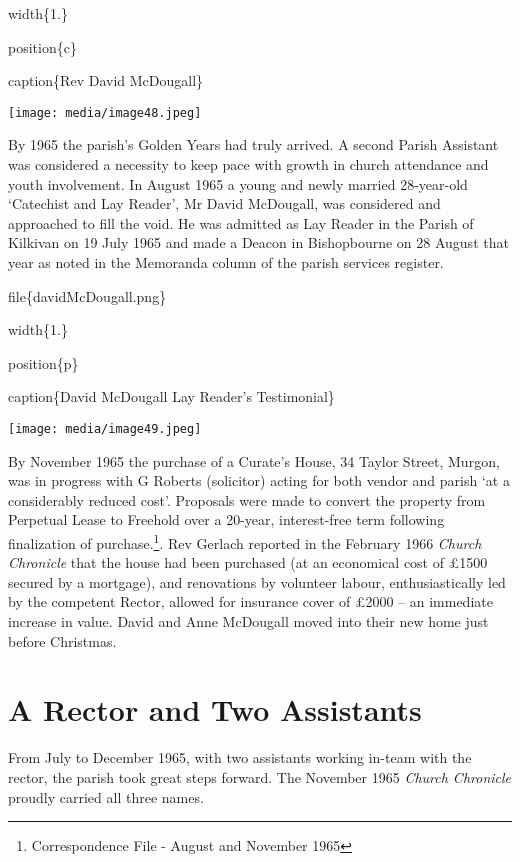 width\{1.\}

position\{c\}

caption\{Rev David McDougall\}

\texttt{[image: media/image48.jpeg]}

By 1965 the parish's Golden Years had truly arrived. A second Parish Assistant was considered a necessity to keep pace with growth in church attendance and youth involvement. In August 1965 a young and newly married 28-year-old `Catechist and Lay Reader', Mr David McDougall, was considered and approached to fill the void. He was admitted as Lay Reader in the Parish of Kilkivan on 19 July 1965 and made a Deacon in Bishopbourne on 28 August that year as noted in the Memoranda column of the parish services register.

file\{davidMcDougall.png\}

width\{1.\}

position\{p\}

caption\{David McDougall Lay Reader's Testimonial\}

\texttt{[image: media/image49.jpeg]}

By November 1965 the purchase of a Curate's House, 34 Taylor Street, Murgon, was in progress with G Roberts (solicitor) acting for both vendor and parish `at a considerably reduced cost'. Proposals were made to convert the property from Perpetual Lease to Freehold over a 20-year, interest-free term following finalization of purchase.\footnote{Correspondence File - August and November 1965}. Rev Gerlach reported in the February 1966 \emph{Church Chronicle} that the house had been purchased (at an economical cost of £1500 secured by a mortgage), and renovations by volunteer labour, enthusiastically led by the competent Rector, allowed for insurance cover of £2000 -- an immediate increase in value. David and Anne McDougall moved into their new home just before Christmas.

\hypertarget{a-rector-and-two-assistants}{%
\section{A Rector and Two Assistants}\label{a-rector-and-two-assistants}}

From July to December 1965, with two assistants working in-team with the rector, the parish took great steps forward. The November 1965 \emph{Church Chronicle} proudly carried all three names.

